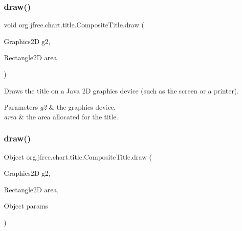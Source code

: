 \mbox{\label{classorg_1_1jfree_1_1chart_1_1title_1_1_composite_title_aee7f0d6bc25159e4afba020c4621fa7c}} 
\subsubsection{\texorpdfstring{draw()}{draw()}\hspace{0.1cm}{\footnotesize\ttfamily [1/2]}}
{\footnotesize\ttfamily void org.\+jfree.\+chart.\+title.\+Composite\+Title.\+draw (\begin{DoxyParamCaption}\item[{Graphics2D}]{g2,  }\item[{Rectangle2D}]{area }\end{DoxyParamCaption})}

Draws the title on a Java 2D graphics device (such as the screen or a printer).


\begin{DoxyParams}{Parameters}
{\em g2} & the graphics device. \\
\hline
{\em area} & the area allocated for the title. \\
\hline
\end{DoxyParams}
\mbox{\label{classorg_1_1jfree_1_1chart_1_1title_1_1_composite_title_aba3d4ae99c4cebc28b67ca69893bfe83}} 
\subsubsection{\texorpdfstring{draw()}{draw()}\hspace{0.1cm}{\footnotesize\ttfamily [2/2]}}
{\footnotesize\ttfamily Object org.\+jfree.\+chart.\+title.\+Composite\+Title.\+draw (\begin{DoxyParamCaption}\item[{Graphics2D}]{g2,  }\item[{Rectangle2D}]{area,  }\item[{Object}]{params }\end{DoxyParamCaption})}

